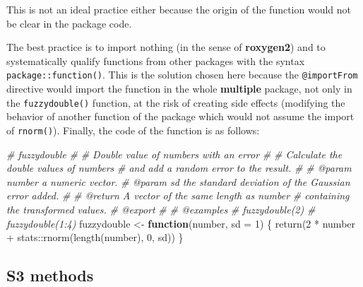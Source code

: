 \documentclass[
  12pt,
  american,
  a4paper,
  extrafontsizes,onecolumn,openright
  ]{memoir}
\newenvironment{Shaded}{\begin{snugshade}}{\end{snugshade}}
\newcommand{\AttributeTok}[1]{\textcolor[rgb]{0.77,0.63,0.00}{#1}}
\newcommand{\CommentTok}[1]{\textcolor[rgb]{0.56,0.35,0.01}{\textit{#1}}}
\newcommand{\ControlFlowTok}[1]{\textcolor[rgb]{0.13,0.29,0.53}{\textbf{#1}}}
\newcommand{\DecValTok}[1]{\textcolor[rgb]{0.00,0.00,0.81}{#1}}
\newcommand{\FunctionTok}[1]{\textcolor[rgb]{0.00,0.00,0.00}{#1}}
\newcommand{\NormalTok}[1]{#1}
\newcommand{\OtherTok}[1]{\textcolor[rgb]{0.56,0.35,0.01}{#1}}
\newcommand{\SpecialCharTok}[1]{\textcolor[rgb]{0.00,0.00,0.00}{#1}}
\begin{document}
\normalsize

This is not an ideal practice either because the origin of the function would not be clear in the package code.

The best practice is to import nothing (in the sense of \textbf{roxygen2}) and to systematically qualify functions from other packages with the syntax \texttt{package::function()}.
This is the solution chosen here because the \texttt{@importFrom} directive would import the function in the whole \textbf{multiple} package, not only in the \texttt{fuzzydouble()} function, at the risk of creating side effects (modifying the behavior of another function of the package which would not assume the import of \texttt{rnorm()}).
Finally, the code of the function is as follows:

\scriptsize

\begin{Shaded}
\begin{Highlighting}[]
\CommentTok{\#\textquotesingle{} fuzzydouble}
\CommentTok{\#\textquotesingle{} }
\CommentTok{\#\textquotesingle{} Double value of numbers with an error}
\CommentTok{\#\textquotesingle{} }
\CommentTok{\#\textquotesingle{} Calculate the double values of numbers }
\CommentTok{\#\textquotesingle{} and add a random error to the result.}
\CommentTok{\#\textquotesingle{}}
\CommentTok{\#\textquotesingle{} @param number a numeric vector.}
\CommentTok{\#\textquotesingle{} @param sd the standard deviation of the Gaussian error added.}
\CommentTok{\#\textquotesingle{}}
\CommentTok{\#\textquotesingle{} @return A vector of the same length as \textasciigrave{}number\textasciigrave{}}
\CommentTok{\#\textquotesingle{}  containing the transformed values.}
\CommentTok{\#\textquotesingle{} @export}
\CommentTok{\#\textquotesingle{}}
\CommentTok{\#\textquotesingle{} @examples}
\CommentTok{\#\textquotesingle{} fuzzydouble(2)}
\CommentTok{\#\textquotesingle{} fuzzydouble(1:4)}
\NormalTok{fuzzydouble }\OtherTok{\textless{}{-}} \ControlFlowTok{function}\NormalTok{(number, }\AttributeTok{sd =} \DecValTok{1}\NormalTok{) \{}
    \FunctionTok{return}\NormalTok{(}\DecValTok{2} \SpecialCharTok{*}\NormalTok{ number }\SpecialCharTok{+}\NormalTok{ stats}\SpecialCharTok{::}\FunctionTok{rnorm}\NormalTok{(}\FunctionTok{length}\NormalTok{(number), }\DecValTok{0}\NormalTok{, sd))}
\NormalTok{\}}
\end{Highlighting}
\end{Shaded}

\normalsize

\hypertarget{s3-methods}{%
\subsection{S3 methods}\label{s3-methods}}
\end{document}

